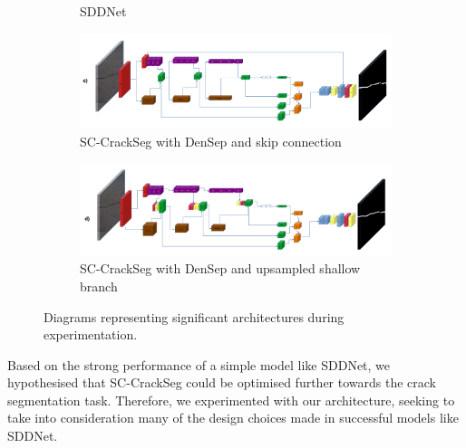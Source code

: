 \documentclass[a4paper,12pt]{report}
\begin{document}
\begin{figure}[t]
\begin{subfigure}[b]{0.6964\textwidth}
        \caption{SDDNet}
        \label{fig:sc-crackseg-versions-sddnet}
    \end{subfigure}
    \begin{subfigure}[b]{0.6964\textwidth}
        \centering
        \includegraphics[width=\textwidth]{res/crack-experiment-diagrams/sc-crackseg-densep-skip.pdf}
        \caption{SC-CrackSeg with DenSep and skip connection}
        \label{fig:sc-crackseg-versions-sc-crackseg-densep-skip}
    \end{subfigure}
    \begin{subfigure}[b]{0.6964\textwidth}
        \centering
        \includegraphics[width=\textwidth]{res/crack-experiment-diagrams/sc-crackseg-densep-upsample.pdf}
        \caption{SC-CrackSeg with DenSep and upsampled shallow branch}
        \label{fig:sc-crackseg-versions-sc-crackseg-densep-upsample}
    \end{subfigure}

    \caption{Diagrams representing significant architectures during experimentation.}
    \label{fig:sc-crackseg-versions}
\end{figure}

Based on the strong performance of a simple model like SDDNet, we hypothesised that SC-CrackSeg could be optimised further towards the crack segmentation task. Therefore, we experimented with our architecture, seeking to take into consideration many of the design choices made in successful models like SDDNet.
\end{document}

